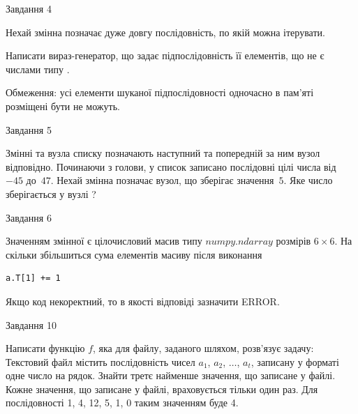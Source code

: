 \documentclass[12pt, ukrainian]{article}
\begin{document}
{\begin{minipage}[t]{8.0cm}
\end{minipage}


               
{\begin{center}Завдання {4}\end{center}}
\vspace{-4mm}
Нехай змінна  позначає дуже довгу послідовність, по якій можна ітерувати.

Написати вираз-генератор, що задає підпослідовність її елементів, що не є числами типу .

Обмеження: усі елементи шуканої підпослідовності одночасно в пам'яті розміщені бути не можуть.\par

\vspace{10mm}
               
{\begin{center}Завдання {5}\end{center}}
\vspace{-4mm}
Змінні  та  вузла списку позначають наступний та попередній за ним вузол відповідно. Починаючи з голови, у список записано послідовні цілі числа від~$-45$ до~$47$. Нехай змінна  позначає вузол, що зберігає значення~$5$.
Яке число зберігається у вузлі  ?\par

               
{\begin{center}Завдання {6}\end{center}}
\vspace{-4mm}
Значенням змінної  є цілочисловий масив типу $numpy.ndarray$ розмірів $6{\times}6$. На скільки збільшиться сума елементів масиву  після виконання
\begin{verbatim}
a.T[1] += 1
\end{verbatim}


Якщо код некоректний, то в якості відповіді зазначити ERROR.\par

               
{\begin{center}Завдання {10}\end{center}}
\vspace{-4mm}

Написати функцію $f$, яка для файлу, заданого шляхом, розв’язує задачу:\\ Текстовий файл містить послідовність чисел $a_1$, $a_2$, $\ldots$, $a_t$, записану у форматі одне число на рядок. Знайти третє найменше значення, що записане у файлі. Кожне значення, що записане у файлі, враховується тільки один раз. Для послідовності 1, 4, 12, 5, 1, 0 таким значенням буде 4.

}
\end{document}
